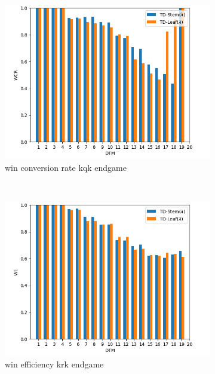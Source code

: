 \begin{figure}
\centering
\begin{subfigure}[]{0.4\textwidth}
\centering
\includegraphics[scale=0.45]{fig/plots/kqk_wcr}
\caption{win conversion rate \gls{kqk} endgame}
\end{subfigure}
\\
\begin{subfigure}[]{0.4\textwidth}
\centering
\includegraphics[scale=0.45]{fig/plots/kqk_we}
\caption{win efficiency \gls{krk} endgame}
\end{subfigure}
\qquad
\begin{subfigure}[]{0.4\textwidth}
\centering

\end{subfigure}
\end{figure}
